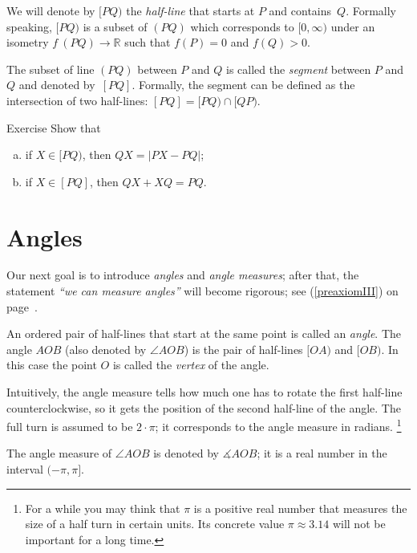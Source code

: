 We will denote by $[P Q)$ the \emph{half-line}
that starts at $P$ and contains~$Q$. 
Formally speaking, $[P Q)$ is a subset of $(P Q)$ which corresponds to $[0,\infty)$ under an isometry $f\:(P Q)\to \mathbb{R}$ such that $f(P)=0$ and $f(Q)>0$.

The subset of line $(P Q)$ between $P$ and $Q$ is called the \emph{segment} between $P$ and $Q$ and denoted by~$[P Q]$.
Formally, the segment can be defined as the intersection of two half-lines: $[P Q]=[P Q)\cap[Q P)$.

\begin{thm}{Exercise}\label{ex:trig==}
Show that 
\begin{enumerate}[(a)]
\item if $X\in [PQ)$, then 
$QX=|PX-PQ|$;
\item if $X\in [PQ]$, then 
$QX+XQ=PQ$.
\end{enumerate}

\end{thm}


\section*{Angles}

Our next goal is to introduce {}\emph{angles} and {}\emph{angle measures}; 
after that, the statement {}\emph{``we can measure angles''} will become rigorous;
see (\ref{preaxiomIII}) on page~\pageref{preaxiomIII}.

An ordered pair of half-lines that start at the same point is called an \emph{angle}.
The angle $AOB$ (also denoted by $\angle AOB$) is the pair of half-lines $[OA)$ and $[OB)$.
In this case the point $O$ is called the \emph{vertex} of the angle.

Intuitively, the angle measure tells how much one has to rotate the first half-line counterclockwise, so it gets the position of the second half-line of the angle. 
The full turn is assumed to be $2\cdot\pi$;
it corresponds to the angle measure in radians.%
\footnote{For a while you may think that $\pi$ is a positive real number that measures the size of a half turn in certain units. Its concrete value $\pi\approx 3.14$ will not be important for a long time.}

The angle measure of $\angle AOB$ is denoted by $\measuredangle AOB$;
it is a real number in the interval $(-\pi,\pi]$. 

